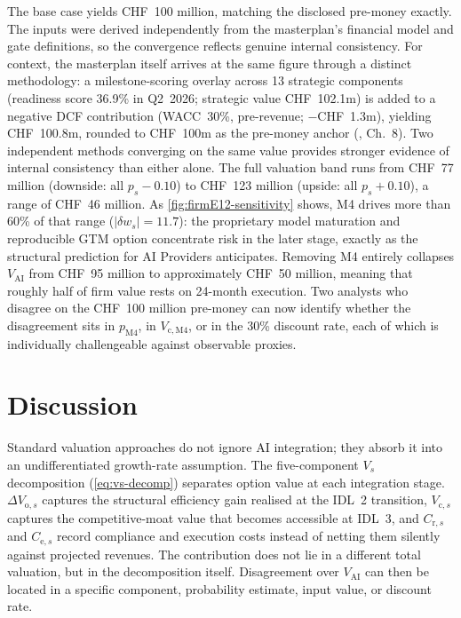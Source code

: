 \documentclass[oneside,10pt]{swissi}
\begin{document}
The base case yields CHF~100 million, matching the disclosed pre-money exactly. The inputs were derived independently from the masterplan's financial model and gate definitions, so the convergence reflects genuine internal consistency. For context, the masterplan itself arrives at the same figure through a distinct methodology: a milestone-scoring overlay across 13 strategic components (readiness score 36.9\% in Q2~2026; strategic value CHF~102.1m) is added to a negative DCF contribution (WACC~30\%, pre-revenue; $-$CHF~1.3m), yielding CHF~100.8m, rounded to CHF~100m as the pre-money anchor (\autocite{firmE12_masterplan}, Ch.~8). Two independent methods converging on the same value provides stronger evidence of internal consistency than either alone. The full valuation band runs from CHF~77 million (downside: all $p_s - 0.10$) to CHF~123 million (upside: all $p_s + 0.10$), a range of CHF~46 million. As \cref{fig:firmE12-sensitivity} shows, M4 drives more than 60\% of that range ($|\delta w_s| = 11.7$): the proprietary model maturation and reproducible GTM option concentrate risk in the later stage, exactly as the structural prediction for AI Providers anticipates. Removing M4 entirely collapses $V_{\mathrm{AI}}$ from CHF~95 million to approximately CHF~50 million, meaning that roughly half of firm value rests on 24-month execution. Two analysts who disagree on the CHF~100 million pre-money can now identify whether the disagreement sits in $p_{\mathrm{M4}}$, in $V_{\mathrm{c},\mathrm{M4}}$, or in the 30\% discount rate, each of which is individually challengeable against observable proxies.

\section{Discussion}

Standard valuation approaches do not ignore AI integration; they absorb it into an undifferentiated growth-rate assumption. The five-component $V_s$ decomposition (\cref{eq:vs-decomp}) separates option value at each integration stage. $\Delta V_{\mathrm{o},s}$ captures the structural efficiency gain realised at the IDL~2 transition, $V_{\mathrm{c},s}$ captures the competitive-moat value that becomes accessible at IDL~3, and $C_{\mathrm{r},s}$ and $C_{\mathrm{e},s}$ record compliance and execution costs instead of netting them silently against projected revenues. The contribution does not lie in a different total valuation, but in the decomposition itself. Disagreement over $V_{\mathrm{AI}}$ can then be located in a specific component, probability estimate, input value, or discount rate.
\end{document}
